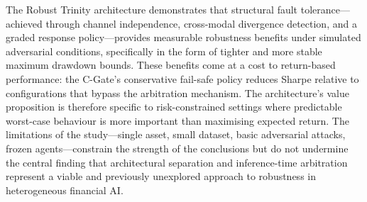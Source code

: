 The Robust Trinity architecture demonstrates that structural fault
tolerance---achieved through channel independence, cross-modal divergence
detection, and a graded response policy---provides measurable robustness
benefits under simulated adversarial conditions, specifically in the form of
tighter and more stable maximum drawdown bounds. These benefits come at a
cost to return-based performance: the C-Gate's conservative fail-safe policy
reduces Sharpe relative to configurations that bypass the arbitration
mechanism. The architecture's value proposition is therefore specific to
risk-constrained settings where predictable worst-case behaviour is more
important than maximising expected return. The limitations of the study---single
asset, small dataset, basic adversarial attacks, frozen agents---constrain
the strength of the conclusions but do not undermine the central finding that
architectural separation and inference-time arbitration represent a viable and
previously unexplored approach to robustness in heterogeneous financial AI.
